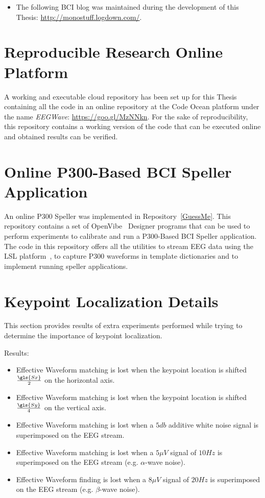 \begin{itemize}
\item The following BCI blog was maintained during the development of this Thesis: \url{http://monostuff.logdown.com/}.
\end{itemize}

\section{Reproducible Research Online Platform}

A working and executable cloud repository has been set up for this Thesis containing all the code in an online repository at the Code Ocean platform under the name \textit{EEGWave}: \url{https://goo.gl/MzNNkn}.  For the sake of reproducibility, this repository contains a working version of the code that can be executed online and obtained results can be verified.

\section{Online P300-Based BCI Speller Application}

An online P300 Speller was implemented in Repository~\ref{GuessMe}.  This repository contains a set of OpenVibe~\cite{Renard2010} Designer programs that can be used to perform experiments to calibrate and run a P300-Based BCI Speller application.  The code in this repository offers all the utilities to stream EEG data using the LSL platform~\cite{Labstreaminglayer}, to capture P300 waveforms in template dictionaries and to implement running speller applications.

\section{Keypoint Localization Details}

This section provides results of extra experiments performed while trying to determine the importance of keypoint localization.

Results:

\begin{itemize}
\item Effective Waveform matching is lost when the keypoint location is shifted $\frac{\gls{Sx}}{2}$ on the horizontal axis.
\item Effective Waveform matching is lost when the keypoint location is shifted $\frac{\gls{Sy}}{4}$ on the vertical axis.
\item Effective Waveform matching is lost when a $5 \si{db}$ additive white noise signal is superimposed on the EEG stream. 
\item Effective Waveform matching is lost when a $5 \mu V$ signal of $10 \si{Hz}$ is superimposed on the EEG stream (e.g. $\alpha$-wave noise).
\item Effective Waveform finding is lost when a $8 \mu V$ signal of $20 \si{Hz}$ is superimposed on the EEG stream (e.g. $\beta$-wave noise).  
\end{itemize}

